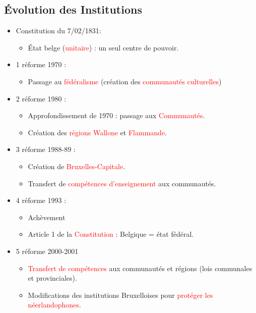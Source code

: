\subsection{Évolution des Institutions}

\begin{itemize}
	\item Constitution du 7/02/1831:
	\begin{itemize}
		\item État belge (\textcolor{red}{unitaire}) : un seul centre de pouvoir.
	\end{itemize}
	\item 1 réforme 1970 :
	\begin{itemize}
		\item Passage au \textcolor{red}{fédéralisme} (création des \textcolor{red}{communautés culturelles})
	\end{itemize}
	\item 2 réforme 1980 :
	\begin{itemize}
		\item Approfondissement de 1970 : passage aux \textcolor{red}{Communautés}.
		\item Création des \textcolor{red}{régions Wallone} et \textcolor{red}{Flammande}.
	\end{itemize}
	\item 3 réforme 1988-89 :
	\begin{itemize}
		\item Création de \textcolor{red}{Bruxelles-Capitale}.
		\item Transfert de \textcolor{red}{compétences d'enseignement} aux communautés.
	\end{itemize}
	\item 4 réforme 1993 :
	\begin{itemize}
		\item Achèvement
		\item Article 1 de la \textcolor{red}{Constitution} : Belgique = état fédéral.
	\end{itemize}
	\item 5 réforme 2000-2001
	\begin{itemize}
		\item \textcolor{red}{Transfert de compétences} aux communautés et régions (lois communales et provinciales).
		\item Modifications des institutions Bruxelloises pour \textcolor{red}{protéger les néerlandophones}.
	\end{itemize}

\end{itemize}
